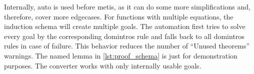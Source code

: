 Internally, auto is used before metis, as it can do some more simplifications and, therefore, cover more edgecases.
For functions with multiple equations, the induction schema will create multiple goals.
The automation first tries to solve every goal by the corresponding domintros rule and falls back to all domintros rules in case of failure.
This behavior reduces the number of ``Unused theorems'' warnings.
The named lemma in \autoref{lst:proof_schema} is just for demonstration purposes.
The converter works with only internally usable goals.
